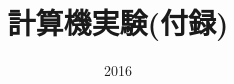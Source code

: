 \documentclass[dvipdfmx]{beamer}
\title{計算機実験(付録)}
\date{2016}
\begin{document}
\begin{frame}
  \titlepage
  \tableofcontents
\end{frame}











\end{document}
